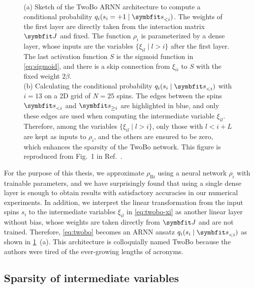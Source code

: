 \begin{figure}[htb]
\centering
\hspace*{\fill}
\hspace*{\fill}
\hspace*{\fill}
\caption[Architecture of the sparse two-body ARNN (TwoBo)]{
(a) Sketch of the TwoBo ARNN architecture to compute a conditional probability $q_i(s_i = +1 \mid \vs_{< i})$.
The weights of the first layer are directly taken from the interaction matrix $\mJ$ and fixed.
The function $\rho_i$ is parameterized by a dense layer, whose inputs are the variables $\{\xi_{i l} \mid l > i\}$ after the first layer.
The last activation function $S$ is the sigmoid function in \cref{eq:sigmoid}, and there is a skip connection from $\xi_{i i }$ to $S$ with the fixed weight $2 \beta$. \\
(b) Calculating the conditional probability $q_i(s_i \mid \vs_{< i})$ with $i = 13$ on a 2D grid of $N = 25$ spins. The edges between the spins $\vs_{< i}$ and $\vs_{\ge i}$ are highlighted in blue, and only these edges are used when computing the intermediate variable $\xi_{i l}$. Therefore, among the variables $\{\xi_{i l} \mid l > i\}$, only those with $l < i + L$ are kept as inputs to $\rho_i$, and the others are ensured to be zero, which enhances the sparsity of the TwoBo network.
This figure is reproduced from Fig.~1 in Ref.~\cite{biazzo2024sparse}.
}
\label{fig:twobo-arch-grid}
\end{figure}

For the purpose of this thesis, we approximate $\rho_{\text{B} i}$ using a neural network $\rho_i$ with trainable parameters, and we have surprisingly found that using a single dense layer is enough to obtain results with satisfactory accuracies in our numerical experiments. In addition, we interpret the linear transformation from the input spins $s_i$ to the intermediate variables $\xi_{i l}$ in \cref{eq:twobo-xi} as another linear layer without bias, whose weights are taken directly from $\mJ$ and are not trained. Therefore, \cref{eq:twobo} becomes an ARNN ansatz $q_i(s_i \mid \vs_{< i})$ as shown in \cref{fig:twobo-arch-grid}~(a). This architecture is colloquially named TwoBo because the authors were tired of the ever-growing lengths of acronyms.

\subsection{Sparsity of intermediate variables}
\label{sec:twobo-sparse}

